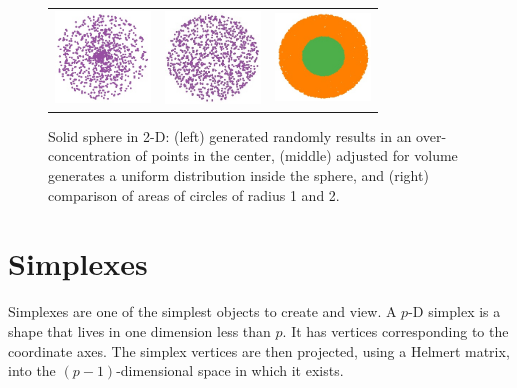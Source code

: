 \documentclass[article]{jss}
\begin{document}
\begin{figure}[ht]
\centering
\begin{tabular}{c c c}
\includegraphics[width=1in]{sphere-2-bad.jpg} 
&\includegraphics[width=1in]{sphere-2-good.jpg} 
&\includegraphics[width=1in]{sphere-2-1and2.jpg}
\end{tabular}
\caption{Solid sphere in 2-D: (left) generated randomly results in an
  over-concentration of points in the center, (middle) adjusted for
  volume generates a uniform distribution inside the sphere, and
  (right) comparison of areas of circles of radius 1 and 2.}
\label{cfb}
\end{figure}

\section{Simplexes}

Simplexes are one of the simplest objects to create and view. A $p$-D
simplex is a shape that lives in one dimension less than $p$. It has
vertices corresponding to the coordinate axes. The simplex vertices
are then projected, using a Helmert matrix, into the
$(p-1)$-dimensional space in which it exists.
\end{document}
